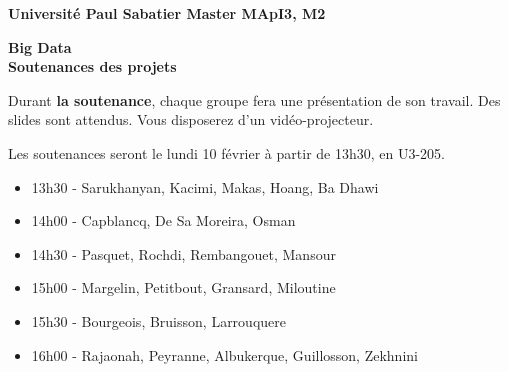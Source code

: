\documentclass[11pt,reqno]{amsart}
\newcommand {\COURS} {Big Data}
\newcommand {\FORMATION} {Universit\'e Paul Sabatier \hfill Master MApI3, M2}
\begin{document}
\addtolength{\baselineskip}{+0.1\baselineskip}
\pagestyle{empty}
{\sc \bf \noindent \FORMATION \\

}
\vspace{0.5cm}
\begin{center}
    {\bf \COURS \\
        \vspace{0.5cm}
        Soutenances des projets\\
    }
\end{center}
\vspace{1cm}

Durant {\bf la soutenance}, chaque groupe fera une présentation de son travail. Des slides sont attendus. Vous disposerez d'un vidéo-projecteur.

\vspace*{0.5cm}


Les soutenances seront le lundi 10 février à partir de 13h30, en U3-205.

\begin{itemize}
	\item{13h30 -} Sarukhanyan, Kacimi, Makas, Hoang, Ba Dhawi
	\item{14h00 -} Capblancq, De Sa Moreira, Osman
	\item{14h30 -} Pasquet, Rochdi, Rembangouet, Mansour
	\item{15h00 -} Margelin, Petitbout, Gransard, Miloutine
	\item{15h30 -} Bourgeois, Bruisson, Larrouquere
	\item{16h00 -} Rajaonah, Peyranne, Albukerque, Guillosson, Zekhnini
\end{itemize}
\end{document}
